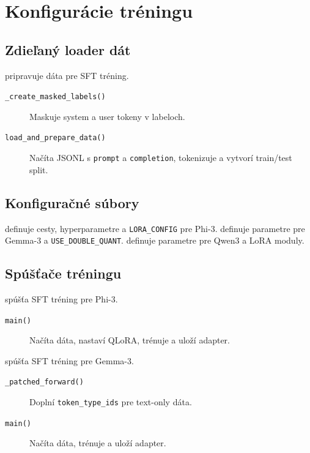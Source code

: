 \section{Konfigurácie tréningu}

\subsection{Zdieľaný loader dát}

\textbf{} pripravuje dáta pre SFT tréning.
\begin{description}
	\item[\texttt{\_create\_masked\_labels()}] Maskuje system a user tokeny v labeloch.
	\item[\texttt{load\_and\_prepare\_data()}] Načíta JSONL s \texttt{prompt} a \texttt{completion}, tokenizuje a vytvorí train/test split.
\end{description}

\subsection{Konfiguračné súbory}

\textbf{} definuje cesty, hyperparametre a \texttt{LORA\_CONFIG} pre Phi-3.
\textbf{} definuje parametre pre Gemma-3 a \texttt{USE\_DOUBLE\_QUANT}.
\textbf{} definuje parametre pre Qwen3 a LoRA moduly.

\subsection{Spúšťače tréningu}

\textbf{} spúšťa SFT tréning pre Phi-3.
\begin{description}
	\item[\texttt{main()}] Načíta dáta, nastaví QLoRA, trénuje a uloží adapter.
\end{description}

\textbf{} spúšťa SFT tréning pre Gemma-3.
\begin{description}
	\item[\texttt{\_patched\_forward()}] Doplní \texttt{token\_type\_ids} pre text-only dáta.
	\item[\texttt{main()}] Načíta dáta, trénuje a uloží adapter.
\end{description}

